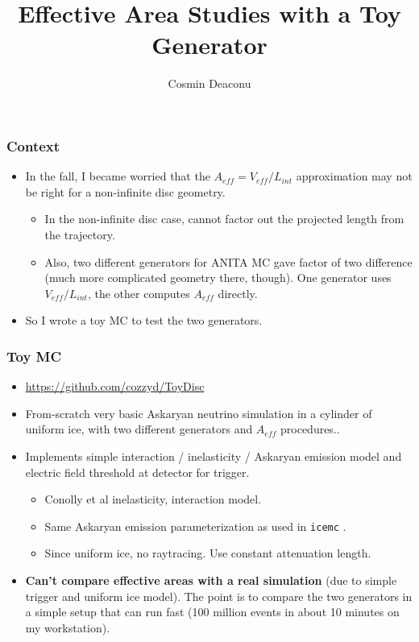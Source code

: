 \documentclass[hyperref={pdfpagelabels=false},aspectratio=169]{beamer} \mode<presentation> { \usetheme{Boadilla} }
\title[Toy Studies]{Effective Area Studies with a Toy Generator}
\author{Cosmin Deaconu}
\institute{UChicago/KICP}
\begin{document}
 

\begin{frame}[plain]
  \maketitle
\end{frame} 

\begin{frame}
\frametitle{Context} 
\begin{itemize} 
\item In the fall, I became worried that the $A_{eff} = V_{eff}/L_{int}$ approximation may not be right for a non-infinite disc geometry. 
\begin{itemize}
\item In the non-infinite disc case, cannot factor out the projected length from the trajectory. 
\item Also, two different generators for ANITA MC gave factor of two difference (much more complicated geometry there, though). One generator uses $V_{eff}/L_{int}$, the other computes $A_{eff}$ directly. 
\end{itemize}
\item So I wrote a toy MC to test the two generators. 
\end{itemize} 
\end{frame} 

\begin{frame} 
\frametitle{Toy MC} 
\begin{itemize}
\item \url{https://github.com/cozzyd/ToyDisc} 
\item From-scratch very basic Askaryan neutrino simulation in a cylinder of uniform ice, with two different generators and $A_{eff}$ procedures..  
\item Implements simple interaction / inelasticity / Askaryan emission model and electric field threshold at detector for trigger. 
\begin{itemize}
\item Conolly et al inelasticity, interaction model. 
\item Same Askaryan emission parameterization as used in \texttt{icemc} . 
\item Since uniform ice, no raytracing.  Use constant attenuation length. 
\end{itemize} 
\item \textbf{Can't compare effective areas with a real simulation} (due to simple trigger and uniform ice model). The point is to compare the two generators in a simple setup that can run fast (100 million events in about 10 minutes on my workstation). 
\end{itemize}
\end{frame}
\end{document}
